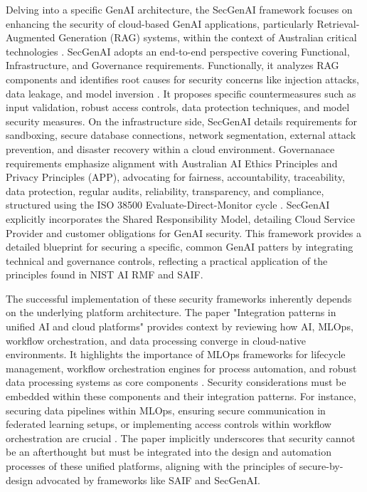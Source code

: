 Delving into a specific GenAI architecture, the SecGenAI framework focuses on enhancing the security of cloud-based GenAI applications, particularly Retrieval-Augmented Generation (RAG) systems, within the context of Australian critical technologies \cite{haryanto_secgenai_2024}. SecGenAI adopts an end-to-end perspective covering Functional, Infrastructure, and Governance requirements. Functionally, it analyzes RAG components and identifies root causes for security concerns like injection attacks, data leakage, and model inversion \cite{haryanto_secgenai_2024}. It proposes specific countermeasures such as input validation, robust access controls, data protection techniques, and model security measures\cite{haryanto_secgenai_2024}. On the infrastructure side, SecGenAI details requirements for sandboxing, secure database connections, network segmentation, external attack prevention, and disaster recovery within a cloud environment\cite{haryanto_secgenai_2024}. Governanace requirements emphasize alignment with Australian AI Ethics Principles and Privacy Principles (APP), advocating for fairness, accountability, traceability, data protection, regular audits, reliability, transparency, and compliance, structured using the ISO 38500 Evaluate-Direct-Monitor cycle \cite{noauthor_isoiec_nodate}. SecGenAI explicitly incorporates the Shared Responsibility Model, detailing Cloud Service Provider and customer obligations for GenAI security\cite{haryanto_secgenai_2024}. This framework provides a detailed blueprint for securing a specific, common GenAI patters by integrating technical and governance controls, reflecting a practical application of the principles found in NIST AI RMF and SAIF.

The successful implementation of these security frameworks inherently depends on the underlying platform architecture. The paper "Integration patterns in unified AI and cloud platforms" provides context by reviewing how AI, MLOps, workflow orchestration, and data processing converge in cloud-native environments\cite{sushil_prabhu_prabhakaran_integration_2024}. It highlights the importance of MLOps frameworks for lifecycle management, workflow orchestration engines for process automation, and robust data processing systems as core components \cite{sushil_prabhu_prabhakaran_integration_2024}. Security considerations must be embedded within these components and their integration patterns. For instance, securing data pipelines within MLOps, ensuring secure communication in federated learning setups, or implementing access controls within workflow orchestration are crucial \cite{sushil_prabhu_prabhakaran_integration_2024, hansen_introducing_2023, haryanto_secgenai_2024}. The paper implicitly underscores that security cannot be an afterthought but must be integrated into the design and automation processes of these unified platforms, aligning with the principles of secure-by-design advocated by frameworks like SAIF and SecGenAI.

